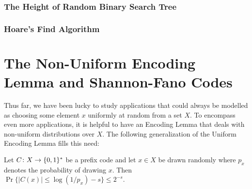 \documentclass{patmorin}
\begin{document}
%
%

\subsubsection{The Height of Random Binary Search Tree}

\subsubsection{Hoare's Find Algorithm}


\section{The Non-Uniform Encoding Lemma and Shannon-Fano Codes}

Thus far, we have been lucky to study applications that could always
be modelled as choosing some element $x$ uniformly at random from a
set $X$. To encompass even more applications, it is helpful to have
an Encoding Lemma that deals with non-uniform distributions over $X$.
The following generalization of the Uniform Encoding Lemma fills this
need:

\begin{lem}  
  Let $C\colon X\to\{0,1\}^*$ be a prefix code and let $x\in X$ be
  drawn randomly where $p_x$ denotes the probability of drawing $x$.
  Then $\Pr\{ |C(x)| \le \log(1/p_x)-s\} \le 2^{-s}$.
\end{lem}
\end{document}
